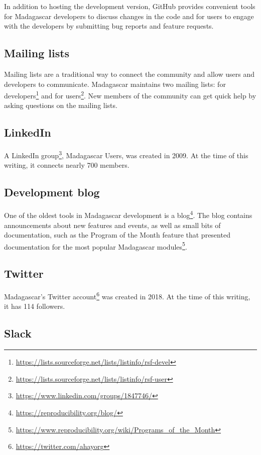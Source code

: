 In addition to hosting the development version, GitHub provides
convenient tools for Madagascar developers to discuss changes in the
code and for users to engage with the developers by submitting bug
reports and feature requests. 

\subsection{Mailing lists}

Mailing lists are a traditional way to connect the community and allow
users and developers to communicate. Madagascar maintains two mailing
lists: for
developers\footnote{\url{https://lists.sourceforge.net/lists/listinfo/rsf-devel}}
and for
users\footnote{\url{https://lists.sourceforge.net/lists/listinfo/rsf-user}}. New
members of the community can get quick help by asking questions on the
mailing lists.

\subsection{LinkedIn}

A LinkedIn
group\footnote{\url{https://www.linkedin.com/groups/1847746/}},
Madagascar Users, was created in 2009. At the time of this writing, it
connects nearly 700 members.

\subsection{Development blog}

One of the oldest tools in Madagascar development is a
blog\footnote{\url{https://reproducibility.org/blog/}}. The blog
contains announcements about new features and events, as well as small
bits of documentation, such as the Program of the Month feature that
presented documentation for the most popular Madagascar
modules\footnote{\url{https://www.reproducibility.org/wiki/Programs_of_the_Month}}.

\subsection{Twitter}

Madagascar's Twitter
account\footnote{\url{https://twitter.com/ahayorg}} was created in
2018. At the time of this writing, it has 114 followers.

\subsection{Slack}

